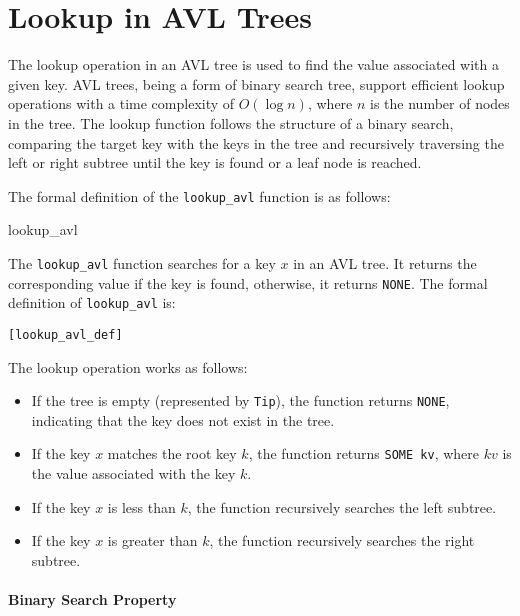 \chapter{Lookup in AVL Trees}\label{chap:LaTeXAdvice}

The lookup operation in an AVL tree is used to find the value associated with a given key. AVL trees, being a form of binary search tree, support efficient lookup operations with a time complexity of \( O(\log n) \), where \( n \) is the number of nodes in the tree. The lookup function follows the structure of a binary search, comparing the target key with the keys in the tree and recursively traversing the left or right subtree until the key is found or a leaf node is reached.

The formal definition of the \texttt{lookup\_avl} function is as follows:

\begin{defn}{lookup\_avl}

The \texttt{lookup\_avl} function searches for a key \( x \) in an AVL tree. It returns the corresponding value if the key is found, otherwise, it returns \texttt{NONE}. The formal definition of \texttt{lookup\_avl} is:


\begin{alltt}
	[lookup_avl_def]
\end{alltt}

\end{defn}


The lookup operation works as follows:
\begin{itemize}
    \item If the tree is empty (represented by \texttt{Tip}), the function returns \texttt{NONE}, indicating that the key does not exist in the tree.
    \item If the key \( x \) matches the root key \( k \), the function returns \texttt{SOME kv}, where \( kv \) is the value associated with the key \( k \).
    \item If the key \( x \) is less than \( k \), the function recursively searches the left subtree.
    \item If the key \( x \) is greater than \( k \), the function recursively searches the right subtree.
\end{itemize}

\subsubsection{Binary Search Property}

